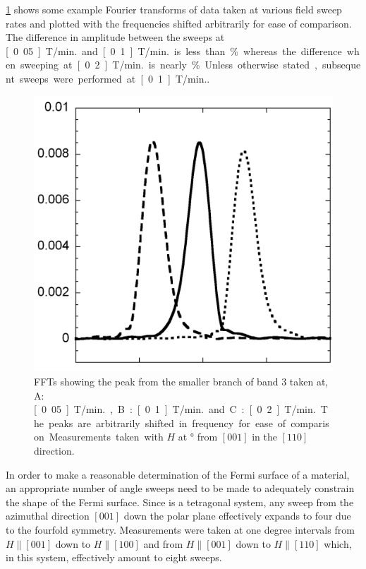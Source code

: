  \Fig\ref{Fig:3:ComparisonSweepRates} shows some example Fourier transforms of data taken at various field sweep rates and plotted with the frequencies shifted arbitrarily for ease of comparison. The difference in amplitude between the sweeps at \unit[0.05]{T/min.} and \unit[0.1]{T/min.} is less than \unit[1]{\%} whereas the difference when sweeping at \unit[0.2]{T/min.} is nearly \unit[5]{\%}. Unless otherwise stated, subsequent sweeps were performed at \unit[0.1]{T/min.}.
\begin{figure}[htbp]
    \begin{center}
        \includegraphics[scale=0.7]{Chapter3-dHvABaFe2P2/Figures/AngleDepMeasurements/SweepRateComparison/SweepRateComparison}
        \caption{FFTs showing the peak from the smaller branch of band $3$ taken at, A: \unit[0.05]{T/min.}, B: \unit[0.1]{T/min.} and C: \unit[0.2]{T/min.}. The peaks are arbitrarily shifted in frequency for ease of comparison. Measurements taken with $H$ at \unit[10]{\degree} from $[001]$ in the $[110]$ direction.}
        \label{Fig:3:ComparisonSweepRates}
    \end{center}
\end{figure}

In order to make a reasonable determination of the Fermi surface of a material, an appropriate number of angle sweeps need to be made to adequately constrain the shape of the Fermi surface. Since \BaFeP is a tetragonal system, any sweep from the azimuthal direction $[001]$ down the polar plane effectively expands to four due to the fourfold symmetry. Measurements were taken at one degree intervals from $H\parallel[001]$ down to $H\parallel[100]$ and from $H\parallel[001]$ down to $H\parallel[110]$ which, in this system, effectively amount to eight sweeps.

